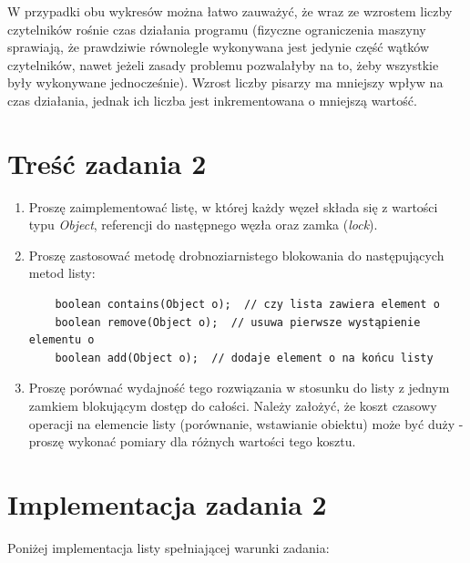 \documentclass{article}
\begin{document}
W przypadki obu wykresów można łatwo zauważyć, że wraz ze wzrostem liczby czytelników rośnie czas 
działania programu (fizyczne ograniczenia maszyny sprawiają, że prawdziwie równolegle wykonywana
jest jedynie część wątków czytelników, nawet jeżeli zasady problemu pozwalałyby na to, żeby wszystkie
były wykonywane jednocześnie). Wzrost liczby pisarzy ma mniejszy wpływ na czas działania, jednak ich
liczba jest inkrementowana o mniejszą wartość.

\section{Treść zadania 2}

\begin{enumerate}
    \item 
    Proszę zaimplementować listę, w której każdy węzeł składa się z wartości typu \textit{Object}, 
    referencji do następnego węzła oraz zamka (\textit{lock}).
    \item
    Proszę zastosować metodę drobnoziarnistego blokowania do następujących metod listy:
    \begin{verbatim}
    boolean contains(Object o);  // czy lista zawiera element o
    boolean remove(Object o);  // usuwa pierwsze wystąpienie elementu o
    boolean add(Object o);  // dodaje element o na końcu listy  
    \end{verbatim}
    \item
    Proszę porównać wydajność tego rozwiązania w stosunku do listy z jednym zamkiem 
    blokującym dostęp do całości. Należy założyć, że koszt czasowy operacji na elemencie 
    listy (porównanie, wstawianie obiektu) może być duży - proszę wykonać pomiary dla różnych 
    wartości tego kosztu.
\end{enumerate}




\section{Implementacja zadania 2}

Poniżej implementacja listy spełniającej warunki zadania:
\end{document}
